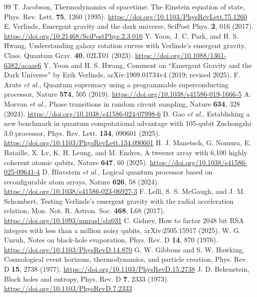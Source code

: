 \documentclass[aps,prd,twocolumn,superscriptaddress,nofootinbib,showkeys]{revtex4-2}
\begin{document}
\begin{thebibliography}{99}
 T. Jacobson, Thermodynamics of spacetime: The Einstein equation of state, Phys. Rev. Lett. \textbf{75}, 1260 (1995). \url{https://doi.org/10.1103/PhysRevLett.75.1260}
 E. Verlinde, Emergent gravity and the dark universe, SciPost Phys. \textbf{2}, 016 (2017). \url{https://doi.org/10.21468/SciPostPhys.2.3.016}
 Y. Yoon, J. C. Park, and H. S. Hwang, Understanding galaxy rotation curves with Verlinde's emergent gravity, Class. Quantum Grav. \textbf{40}, 02LT01 (2023). \url{https://doi.org/10.1088/1361-6382/acaae6}
 Y. Yoon and H. S. Hwang, Comment on ``Emergent Gravity and the Dark Universe'' by Erik Verlinde, arXiv:1909.01734v4 (2019; revised 2025).
 F. Arute \emph{et al.}, Quantum supremacy using a programmable superconducting processor, Nature \textbf{574}, 505 (2019). \url{https://doi.org/10.1038/s41586-019-1666-5}
 A. Morvan \emph{et al.}, Phase transitions in random circuit sampling, Nature \textbf{634}, 328 (2024). \url{https://doi.org/10.1038/s41586-024-07998-6}
 D. Gao \emph{et al.}, Establishing a new benchmark in quantum computational advantage with 105-qubit Zuchongzhi 3.0 processor, Phys. Rev. Lett. \textbf{134}, 090601 (2025). \url{https://doi.org/10.1103/PhysRevLett.134.090601}
 H. J. Manetsch, G. Nomura, E. Bataille, X. Lv, K. H. Leung, and M. Endres, A tweezer array with 6,100 highly coherent atomic qubits, Nature \textbf{647}, 60 (2025). \url{https://doi.org/10.1038/s41586-025-09641-4}
 D. Bluvstein \emph{et al.}, Logical quantum processor based on reconfigurable atom arrays, Nature \textbf{626}, 58 (2024). \url{https://doi.org/10.1038/s41586-023-06927-3}
 F. Lelli, S. S. McGaugh, and J. M. Schombert, Testing Verlinde's emergent gravity with the radial acceleration relation, Mon. Not. R. Astron. Soc. \textbf{468}, L68 (2017). \url{https://doi.org/10.1093/mnrasl/slx031}
 C. Gidney, How to factor 2048 bit RSA integers with less than a million noisy qubits, arXiv:2505.15917 (2025).
 W. G. Unruh, Notes on black-hole evaporation, Phys. Rev. D \textbf{14}, 870 (1976). \url{https://doi.org/10.1103/PhysRevD.14.870}
 G. W. Gibbons and S. W. Hawking, Cosmological event horizons, thermodynamics, and particle creation, Phys. Rev. D \textbf{15}, 2738 (1977). \url{https://doi.org/10.1103/PhysRevD.15.2738}
 J. D. Bekenstein, Black holes and entropy, Phys. Rev. D \textbf{7}, 2333 (1973). \url{https://doi.org/10.1103/PhysRevD.7.2333}

\end{thebibliography}
\end{document}
